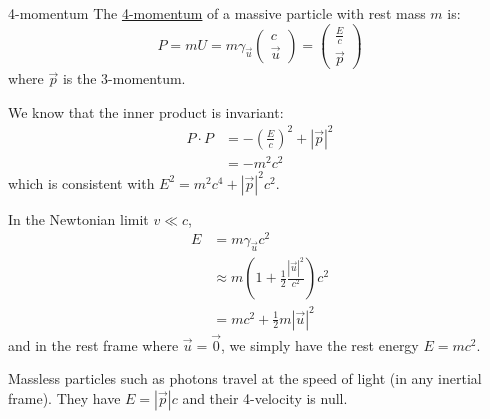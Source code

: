 \documentclass[../Main.tex]{subfiles}
\begin{document}
\begin{definition}{4-momentum}
    The \underline{4-momentum} of a massive particle with rest mass $m$ is:
    \begin{equation*}
        P = mU = m\gamma_{\vec{u}} \begin{pmatrix}c \\ \vec{u}\end{pmatrix} = \begin{pmatrix}\frac{E}{c} \\ \vec{p}\end{pmatrix}
    \end{equation*}
    where $\vec{p}$ is the 3-momentum.
\end{definition}
We know that the inner product is invariant:
\begin{align*}
    P \cdot P &= -\left(\frac{E}{c}\right)^2 + |\vec{p}|^2 \\
    &= -m^2 c^2
\end{align*}
which is consistent with $E^2 = m^2 c^4 + |\vec{p}|^2 c^2$.

In the Newtonian limit $v \ll c$,
\begin{align*}
    E &= m \gamma_{\vec{u}} c^2 \\
    &\approx m\left(1 + \frac12 \frac{|\vec{u}|^2}{c^2}\right) c^2 \\
    &= mc^2 + \frac12 m |\vec{u}|^2
\end{align*}
and in the rest frame where $\vec{u} = \vec0$, we simply have the rest energy $E = mc^2$.

Massless particles such as photons travel at the speed of light (in any inertial frame). They have $E = |\vec{p}|c$ and their 4-velocity is null.
\end{document}
